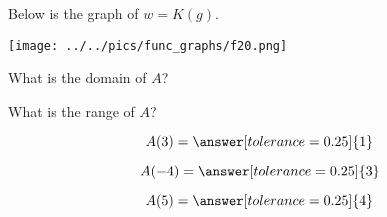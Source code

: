 \documentclass{ximera}
\author{Lee Wayand}
\begin{document}
\begin{exercise}  





Below is the graph of $w=K(g)$.  

\begin{image}
\texttt{[image: ../../pics/func\_graphs/f20.png]}
\end{image}









\begin{question} 


What is the domain of $A$?\\


\begin{multipleChoice}
\choice [correct]{$(-\infty, -7) \cup [-4, \infty)$}
\choice {$(-\infty, -7) \cup [-4, 3) \cup (3, \infty)$}
\choice {$(-\infty, \infty)$}
\end{multipleChoice}

\end{question}






\begin{question} 


What is the range of $A$?\\


\begin{multipleChoice}
\choice [correct]{$(-\infty, \infty)$}
\choice {$[-6, 7.5]$}
\end{multipleChoice}


\end{question}









\begin{question} 



\[  A(3) = \answer[tolerance=0.25]{1}  \]


\[  A(-4) = \answer[tolerance=0.25]{3}  \]


\[  A(5) = \answer[tolerance=0.25]{4}  \]

\end{question}











\end{exercise}
\end{document}
